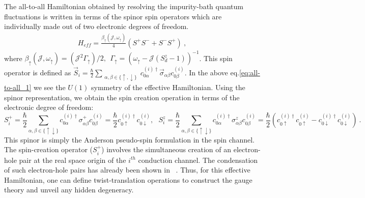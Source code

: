 \documentclass[reprint,onecolumn,prb,superscriptaddress]{revtex4-2}
\begin{document}
The all-to-all Hamiltonian obtained by resolving the impurity-bath quantum fluctuations is written in terms of the spinor spin operators which are individually made out of two electronic degrees of freedom.
\begin{equation}\begin{aligned}
H_{eff} 
 =\frac{\beta_{\uparrow}({\mathcal{J}},\omega_{\uparrow})}{4} (S^+S^-+S^-S^+)~,
\label{eq:all-to-all_1}
\end{aligned}\end{equation}
where \(\beta_{\uparrow} ({\mathcal{J}},\omega_{\uparrow})= ({\mathcal{J}}^2 \Gamma_{\uparrow})/2, ~ ~\Gamma_{\uparrow}=(\omega_{\uparrow}-{\mathcal{J}}(S_d^z-1))^{-1}\). This spin operator is defined as $\vec{S}_i=\frac{\hbar}{2} \displaystyle\sum_{\substack{ \alpha,\beta\in \{\uparrow,\downarrow\}}}  c_{0\alpha}^{(i)\dagger} \vec{\sigma}_{\alpha\beta} c_{0\beta}^{(i)}$. In the above eq.\eqref{eq:all-to-all_1} we see the $U(1)$ symmetry of the effective Hamiltonian. Using the spinor representation, we obtain the spin creation operation in terms of the electronic degree of freedom:
\begin{equation}
S_i^+ = \frac{\hbar}{2} \displaystyle\sum_{\alpha,\beta\in \{\uparrow\downarrow\}} c_{0\alpha}^{(i)\dagger} {\sigma}^{+}_{\alpha\beta} c_{0\beta}^{(i)}
=\frac{\hbar}{2} c_{0\uparrow}^{(i)\dagger} c_{0\downarrow}^{(i)}, ~ ~ ~S_i^z = \frac{\hbar}{2} \displaystyle\sum_{\alpha,\beta\in \{\uparrow\downarrow\}} c_{0\alpha}^{(i)\dagger} {\sigma}^{z}_{\alpha\beta} c_{0\beta}^{(i)} =\frac{\hbar}{2} (c_{0\uparrow}^{(i)\dagger} c_{0\uparrow}^{(i)} - c_{0\downarrow}^{(i)\dagger} c_{0\downarrow}^{(i)} )~.
\end{equation}
This spinor is simply the Anderson pseudo-spin formulation in the spin channel. The spin-creation operator ($S_i^+$) involves the simultaneous creation of an electron-hole pair at the real space origin of the $i^{th}$ conduction channel. The condensation of such electron-hole pairs has already been shown in ~\cite{anirbanmott1,anirbanmott2}. Thus, for this effective Hamiltonian, one can define twist-translation operations to construct the gauge theory and unveil any hidden degeneracy.
\end{document}
